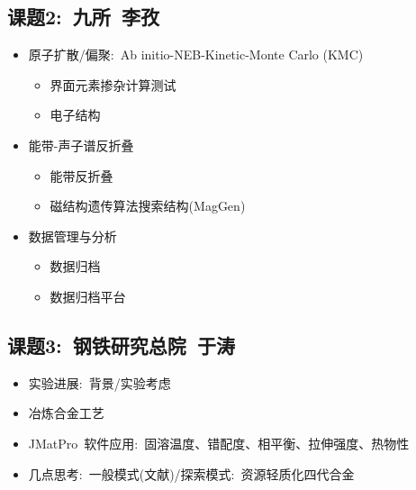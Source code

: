 \documentclass[10pt,a4paper]{article}
\begin{document}
\begin{itemize}
\subsection{课题2:~九所~李孜}
\begin{itemize}
	\item 原子扩散/偏聚:~\textrm{Ab initio-NEB-Kinetic-Monte Carlo (KMC)}
		\begin{itemize}
			\item 界面元素掺杂计算测试
			\item 电子结构
		\end{itemize}
	\item 能带-声子谱反折叠
		\begin{itemize}
			\item 能带反折叠
			\item 磁结构遗传算法搜索结构(\textrm{MagGen})
		\end{itemize}
	\item 数据管理与分析
		\begin{itemize}
			\item 数据归档
			\item 数据归档平台
		\end{itemize}
\end{itemize}


\subsection{课题3:~钢铁研究总院~于涛}
\begin{itemize}
	\item 实验进展:~背景/实验考虑
	\item 冶炼合金工艺
	\item \textrm{JMatPro~}软件应用:~固溶温度、错配度、相平衡、拉伸强度、热物性
	\item 几点思考:~一般模式(文献)/探索模式:~资源轻质化四代合金
\end{itemize}




\end{itemize}
\end{document}
